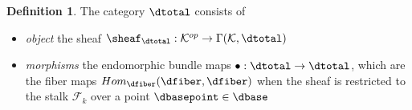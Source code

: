 \documentclass[10pt,journal,compsoc]{IEEEtran}
\theoremstyle{definition}
\newtheorem{definition}{Definition}[section]
\theoremstyle{remark}
\begin{document}
\begin{definition} The category $\mathcal{\dtotal}$ consists of 
  \begin{itemize}
    \item\textit{object} the sheaf\cite{SheafMathematics2021,ghristElementaryAppliedTopology2014} $\sheaf_{\mathcal{\dtotal}}: \mathcal{K}^{op} \rightarrow \Gamma(\mathcal{K}, \dtotal)$
    \item \textit{morphisms} the endomorphic\cite{fongInvitationAppliedCategory2019} bundle maps $\bullet: \dtotal\rightarrow \dtotal$, which are the fiber maps $Hom_{\mathcal{\dfiber}}(\dfiber,\dfiber)$ when the sheaf is restricted to the stalk\cite{StalkSheaf2019} $\mathscr{F}_{k}$ over a point $\dbasepoint\in \dbase$
  \end{itemize}
\end{definition}
\end{document}
